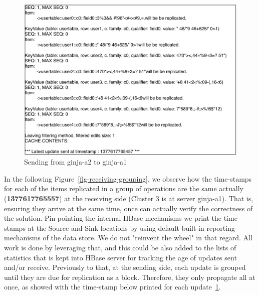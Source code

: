 
\begin{figure}
\centering
\includegraphics[scale=0.6]{figs/ginja2-grouping-send.pdf}
\caption{Sending from ginja-a2 to ginja-a1}
\label{fig-shipping-grouping}
\end{figure}

In the following Figure~\ref{fig-receiving-grouping}, we observe how the time-stamps for each of the items replicated in a group of operations are the same actually (\textbf{1377617765557}) at the receiving side (Cluster 3 is at server ginja-a1). That is, ensuring they arrive at the same time, once can actually verify the correctness of the solution. Pin-pointing the internal HBase mechanisms we print the time-stamps at the Source and Sink locations by using default built-in reporting mechanisms of the data store. We do not "reinvent the wheel" in that regard. All work is done by leveraging that, and this could be also added to the lists of statistics that is kept into HBase server for tracking the age of updates sent and/or receive. Previously to that, at the sending side, each update is grouped until they are due for replication as a block. Therefore, they only propagate all at once, as showed with the time-stamp below printed for each update~\ref{fig-shipping-grouping}.

